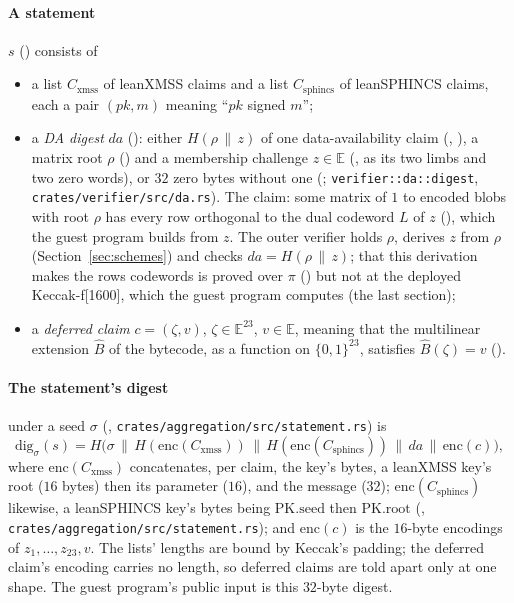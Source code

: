 \documentclass[11pt]{article}
\newcommand{\Cx}{C_{\mathrm{xmss}}}
\newcommand{\Cs}{C_{\mathrm{sphincs}}}
\newcommand{\enc}{\mathrm{enc}}
\begin{document}
\paragraph{A statement} $s$ () consists of
\begin{itemize}
\item a list $\Cx$ of leanXMSS claims and a list $\Cs$ of leanSPHINCS claims, each a pair $(pk, m)$
meaning ``$pk$ signed $m$'';
\item a \emph{DA digest} $\mathit{da}$ (): either $H(\rho \,\|\, z)$ of one
data-availability claim (, ), a matrix root $\rho$
() and a membership challenge $z \in \mathbb{E}$ (, as its
two limbs and two zero words), or $32$ zero bytes without one (;
\texttt{verifier::da::digest}, \texttt{crates/verifier/src/da.rs}). The claim: some matrix of
$1$ to  encoded blobs with root $\rho$ has every row orthogonal to the dual codeword $L$ of $z$
(), which the guest program builds from $z$. The outer verifier holds
$\rho$, derives $z$ from $\rho$ (Section~\ref{sec:schemes}) and checks $\mathit{da} = H(\rho \,\|\, z)$; that
this derivation makes the rows codewords is proved over $\pi$ () but not at the deployed Keccak-f[1600], which the guest program computes (the last section);
\item a \emph{deferred claim} $c = (\zeta, v)$, $\zeta \in \mathbb{E}^{23}$, $v \in \mathbb{E}$, meaning
that the multilinear extension $\widehat{B}$ of the bytecode, as a function on $\{0,1\}^{23}$,
satisfies $\widehat{B}(\zeta) = v$ ().
\end{itemize}

\paragraph{The statement's digest} under a seed $\sigma$ (,
\texttt{crates/aggregation/src/statement.rs}) is
\[
\mathrm{dig}_\sigma(s) = H\big(\sigma \,\|\, H(\enc(\Cx)) \,\|\, H(\enc(\Cs)) \,\|\, \mathit{da} \,\|\, \enc(c)\big),
\]
where $\enc(\Cx)$ concatenates, per claim, the key's bytes, a leanXMSS key's root ($16$ bytes)
then its parameter ($16$), and the message ($32$); $\enc(\Cs)$ likewise, a leanSPHINCS key's bytes
being $\mathrm{PK.seed}$ then $\mathrm{PK.root}$ (,
\texttt{crates/aggregation/src/statement.rs}); and $\enc(c)$ is the $16$-byte encodings of
$z_1, \dots, z_{23}, v$. The lists' lengths are bound by Keccak's padding;
the deferred claim's encoding carries no length, so deferred claims are told apart only at one
shape. The guest program's public input is this $32$-byte digest.
\end{document}
